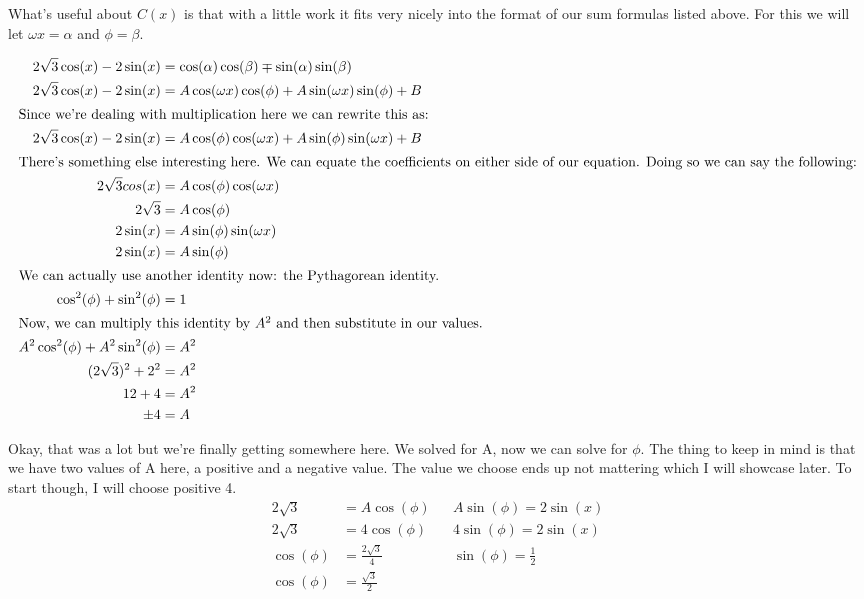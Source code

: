 \documentclass[10pt,letterpaper]{amspset}
\begin{document}
\begin{solution}
    What's useful about $C(x)$ is that with a little work it fits very nicely into the format of our sum formulas listed above. For this we will let $\omega x = \alpha$ and $\phi = \beta$. 
    
    \pagebreak 
    
    \begin{align}
        2\sqrt{3}\cos(x) - 2\sin(x) &= \cos(\alpha) \cos(\beta) \mp \sin(\alpha) \sin(\beta) \\
        2\sqrt{3}\cos(x) - 2\sin(x) &= A \cos(\omega x) \cos(\phi) + A \sin(\omega x) \sin(\phi) + B \\
        \intertext{Since we're dealing with multiplication here we can rewrite this as:}
        2\sqrt{3}\cos(x) - 2\sin(x) &= A \cos(\phi) \cos(\omega x) + A \sin(\phi) \sin(\omega x) + B \\
        \intertext{There's something else interesting here. We can equate the coefficients on either side of our equation. Doing so we can say the following:}
        2\sqrt{3}cos(x) &= A \cos(\phi) \cos(\omega x) \\
        2\sqrt{3} &= A \cos(\phi) \\
        2\sin(x) &= A \sin(\phi) \sin(\omega x) \\
        2\sin(x) &= A \sin(\phi) \\
        \intertext{We can actually use another identity now: the Pythagorean identity.}
        \cos^2(\phi) + \sin^2(\phi) &= 1 \\
        \intertext{Now, we can multiply this identity by $A^2$ and then substitute in our values.}
        A^2 \cos^2(\phi) + A^2 \sin^2(\phi) &= A^2 \\
        (2\sqrt{3})^2 + 2^2 &= A^2 \\
        12 + 4 &= A^2 \\
        \pm 4 &= A
    \end{align}

    Okay, that was a lot but we're finally getting somewhere here. We solved for A, now we can solve for $\phi$. The thing to keep in mind is that we have two values of A here, a positive and a negative value. The value we choose ends up not mattering which I will showcase later. To start though, I will choose positive 4. 
    \begin{align}
        2\sqrt{3} &= A \cos(\phi) && A \sin(\phi) = 2\sin(x) \\
        2\sqrt{3} &= 4 \cos(\phi) && 4 \sin(\phi) = 2\sin(x) \\
        \cos(\phi) &= \frac{2 \sqrt{3}}{4} && \sin(\phi) = \frac{1}{2} \\
        \cos(\phi) &= \frac{\sqrt{3}}{2}
    \end{align}


\end{solution}
\end{document}

